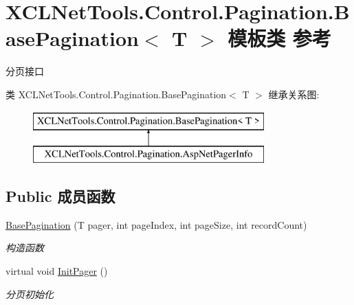 \hypertarget{class_x_c_l_net_tools_1_1_control_1_1_pagination_1_1_base_pagination_3_01_t_01_4}{\section{X\-C\-L\-Net\-Tools.\-Control.\-Pagination.\-Base\-Pagination$<$ T $>$ 模板类 参考}
\label{class_x_c_l_net_tools_1_1_control_1_1_pagination_1_1_base_pagination_3_01_t_01_4}
}


分页接口  


类 X\-C\-L\-Net\-Tools.\-Control.\-Pagination.\-Base\-Pagination$<$ T $>$ 继承关系图\-:\begin{figure}[H]
\begin{center}
\leavevmode
\includegraphics[height=2.000000cm]{class_x_c_l_net_tools_1_1_control_1_1_pagination_1_1_base_pagination_3_01_t_01_4}
\end{center}
\end{figure}
\subsection*{Public 成员函数}
\begin{DoxyCompactItemize}
\item 
\hyperlink{class_x_c_l_net_tools_1_1_control_1_1_pagination_1_1_base_pagination_3_01_t_01_4_ae9e336c1452804e7d4de12ea9fa3ddde}{Base\-Pagination} (T pager, int page\-Index, int page\-Size, int record\-Count)
\begin{DoxyCompactList}\small\item\em 构造函数 \end{DoxyCompactList}\item 
virtual void \hyperlink{class_x_c_l_net_tools_1_1_control_1_1_pagination_1_1_base_pagination_3_01_t_01_4_ab3485196d5422f857f29f96bfbb2faa9}{Init\-Pager} ()
\begin{DoxyCompactList}\small\item\em 分页初始化 \end{DoxyCompactList}\end{DoxyCompactItemize}
